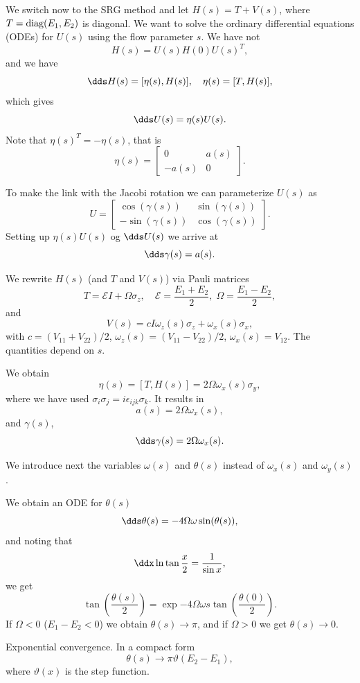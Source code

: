 We switch now to the SRG method and 
let $H(s) = T + V(s)$, where $T= \mathrm{diag}(E_1,E_2)$ is diagonal. We want to solve the ordinary differential equations (ODEs) 
for $U(s)$ using the flow parameter $s$. 
We have not
\[ 
H(s) = U(s)H(0)U(s)^T, 
\]
and we have
\[ 
\dds H(s) = [\eta(s),H(s)],  \quad \eta(s) = [T,H(s)], 
\]
which gives
\[ 
\dds U(s) = \eta(s) U(s). 
\]
Note that $\eta(s)^T = -\eta(s)$, that is
\[ 
\eta(s) = \begin{bmatrix} 0 & a(s) \\ -a(s) & 0 \end{bmatrix}. 
\]

To make the link with the Jacobi rotation
we can parameterize $U(s)$ as
\[ 
U = \begin{bmatrix} \cos(\gamma(s)) & \sin(\gamma(s)) \\ -\sin(\gamma(s)) & \cos(\gamma(s)) \end{bmatrix}. 
\]
Setting up $\eta(s)U(s)$ og $\dds U(s)$ we arrive at 
\[ 
\dds \gamma(s) = a(s). 
\]

We rewrite $H(s)$ (and $T$ and $V(s)$)  via Pauli matrices
\[ 
T = \mathcal{E} I + \Omega \sigma_z, \quad \mathcal{E} = \frac{E_1
  + E_2}{2}, \; \Omega = \frac{E_1-E_2}{2}, 
\]
and
\[ 
V(s) = c I \omega_z(s)\sigma_z + \omega_x(s)\sigma_x, 
\]
with $c = (V_{11}+V_{22})/2$, $\omega_z(s) = (V_{11}-V_{22})/2$,
$\omega_x(s) = V_12$. The quantities depend on
$s$. 

We obtain
\[ \eta(s) = [T, H(s)] = 2\Omega\omega_x(s)\sigma_y, \]
where we have used $\sigma_i\sigma_j = i\epsilon_{ijk}\sigma_k$.
It results in
\[ a(s) = 2\Omega \omega_x(s), \]
and $\gamma(s)$,
\begin{equation} \dds \gamma(s) = 2\Omega\omega_x(s). \label{eq:3}\end{equation}

We introduce next the  variables $\omega(s)$ and $\theta(s)$ instead of
$\omega_x(s)$ and $\omega_y(s)$. 

We obtain an ODE for $\theta(s)$ 
\begin{equation} 
\dds \theta(s) = -4\Omega\omega \sin(\theta(s)), \label{eq:4}
\end{equation}
and noting that
\[ 
\ddx \ln \tan \frac{x}{2} = \frac{1}{\sin x}, 
\]
we get
\[ 
\tan\left(\frac{\theta(s)}{2}\right) = \exp{-4\Omega\omega s} \tan\left(
  \frac{\theta(0)}{2}\right). 
\]
If $\Omega<0$ ($E_1-E_2<0$) we obtain  $\theta(s)\rightarrow \pi$, and if 
$\Omega>0$ we get  $\theta(s)\rightarrow 0$. 

Exponential convergence. In a compact form
\begin{equation} \theta(s) \rightarrow \pi \vartheta(E_2 - E_1),
  \label{eq:5} \end{equation}
where $\vartheta(x)$ is the  step function.

